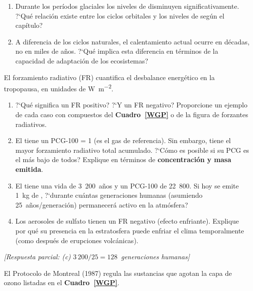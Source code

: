 \begin{bloque_ejercicios}
\begin{ejercicios}
\begin{enumerate}[label=\alph*)]
    \item Durante los per\'iodos glaciales los niveles de 
          disminuyen significativamente. ?`Qu\'e relaci\'on existe
          entre los ciclos orbitales y los niveles de 
          seg\'un el cap\'itulo?

    \item A diferencia de los ciclos naturales, el calentamiento
          actual ocurre en d\'ecadas, no en miles de a\~nos.
          ?`Qu\'e implica esta diferencia en t\'erminos de la
          capacidad de adaptaci\'on de los ecosistemas?
\end{enumerate}

\item El forzamiento radiativo (FR) cuantifica el desbalance
energ\'etico en la tropopausa, en unidades de \si{\watt\per\square\metre}.

\begin{enumerate}[label=\alph*)]
    \item ?`Qu\'e significa un FR positivo? ?`Y un FR negativo?
          Proporcione un ejemplo de cada caso con compuestos
          del \textbf{Cuadro~\ref{WGP}} o de la figura de
          forzantes radiativos.

    \item El  tiene un PCG-100 = 1 (es el gas de
          referencia). Sin embargo, tiene el mayor forzamiento
          radiativo total acumulado. ?`C\'omo es posible si
          su PCG es el m\'as bajo de todos? Explique en t\'erminos
          de \textbf{concentraci\'on y masa emitida}.

    \item El  tiene una vida de 3~200~a\~nos y un
          PCG-100 de 22~800. Si hoy se emite 1~kg de ,
          ?`durante cu\'antas generaciones humanas (asumiendo
          25~a\~nos/generaci\'on) permanecer\'a activo en la
          atm\'osfera?

    \item Los aerosoles de sulfato tienen un FR negativo
          (efecto enfriante). Explique por qu\'e su presencia
          en la estratosfera puede enfriar el clima temporalmente
          (como despu\'es de erupciones volc\'anicas).
\end{enumerate}

\textit{[Respuesta parcial:
(c) $3\,200/25 = 128$~generaciones humanas]}

\item El Protocolo de Montreal (1987) regula las sustancias que
agotan la capa de ozono listadas en el \textbf{Cuadro~\ref{WGP}}.


\end{ejercicios}
\end{bloque_ejercicios}
